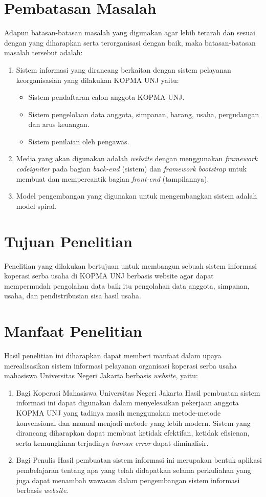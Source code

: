 \section{Pembatasan Masalah}
Adapun batasan-batasan masalah yang digunakan agar lebih terarah dan sesuai dengan yang diharapkan serta terorganisasi dengan baik, maka batasan-batasan masalah tersebut adalah:
\begin{enumerate}
	\item Sistem informasi yang dirancang berkaitan dengan sistem pelayanan keorganisasian yang dilakukan KOPMA UNJ yaitu:
	\begin{itemize}
		\item Sistem pendaftaran calon anggota KOPMA UNJ.
		\item Sistem pengelolaan data anggota, simpanan, barang, usaha, pergudangan dan arus keuangan.
		\item Sistem penilaian oleh pengawas.
	\end{itemize}
	\item Media yang akan digunakan adalah \textit{website} dengan menggunakan \emph{framework codeigniter} pada bagian \emph{back-end} (sistem) dan \emph{framework bootstrap} untuk membuat dan mempercantik bagian \emph{front-end} (tampilannya).
	\item Model pengembangan yang digunakan untuk mengembangkan sistem adalah model spiral. 	
\end{enumerate}

\section{Tujuan Penelitian}
Penelitian yang dilakukan bertujuan untuk membangun sebuah sistem informasi koperasi serba usaha di KOPMA UNJ berbasis website agar dapat mempermudah pengolahan data baik itu pengolahan data anggota, simpanan, usaha, dan pendistribusian sisa hasil usaha.

\section{Manfaat Penelitian}
Hasil penelitian ini diharapkan dapat memberi manfaat dalam upaya merealisasikan sistem informasi pelayanan organisasi koperasi serba usaha mahasiswa Universitas Negeri Jakarta berbasis \emph{website}, yaitu:
\begin{enumerate}
	\item Bagi Koperasi Mahasiswa Universitas Negeri Jakarta 	
	Hasil pembuatan sistem informasi ini dapat digunakan dalam menyelesaikan pekerjaan anggota KOPMA UNJ yang tadinya masih menggunakan metode-metode konvensional dan manual menjadi metode yang lebih modern. Sistem yang dirancang diharapkan dapat membuat ketidak efektifan, ketidak efisienan, serta kemungkinan terjadinya \emph{human error} dapat diminalisir.
	
	\item Bagi Penulis  	
	Hasil pembuatan sistem informasi ini merupakan bentuk aplikasi pembelajaran tentang apa yang telah didapatkan selama perkuliahan yang juga dapat menambah wawasan dalam pengembangan sistem informasi berbasis \emph{website}.	
\end{enumerate}


\begin{comment}

\end{comment}
